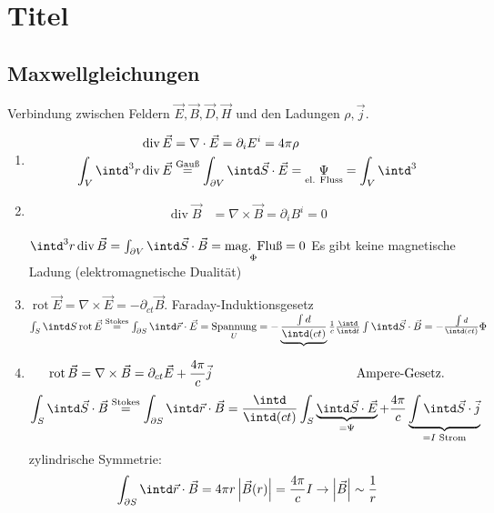 \documentclass{article}
\newcommand{\rot}{\operatorname{rot}}
\renewcommand{\div}{\operatorname{div}}
\begin{document}
    \section*{Titel}
    \subsection{Maxwellgleichungen}
    Verbindung zwischen Feldern $\vec{E}, \vec{B}, \vec{D}, \vec{H}$ und den Ladungen $\rho, \vec{j}$.
    \begin{enumerate}
        \item \begin{align*}
            \div \vec{E} &= \nabla \cdot \vec{E} = \partial_i E^i = 4\pi \rho\\
            \int_V \intd^3 r \div \vec{E} &\stackrel{\text{Gauß}}{=} \int_{\partial V} \intd \vec{S} \cdot \vec{E} = \underset{\text{el. Fluss}}{\Psi} = \int_V \intd^3
        \end{align*}
        \item 
        \begin{align*}
            \div \vec{B} &= \nabla \times \vec{B} = \partial_i B^i = 0
        \end{align*}
        $\intd^3 r \div \vec{B} = \int_{ \partial V} \intd \vec{S} \cdot \vec{B} = \underset{\Phi}{\text{mag. Fluß}} = 0$
        Es gibt keine magnetische Ladung (elektromagnetische Dualität)
        \item $\rot \vec{E} = \nabla \times \vec E = -\partial_{ct} \vec B$. Faraday-Induktionsgesetz
        $\int_S \intd S \rot \vec E \stackrel{\text{Stokes}}{=} \int_{\partial S} \intd \vec r \cdot \vec E = \underset{U}{\text{Spannung}} = -\underbrace{\frac{\int d}{\intd (ct)}}{\frac{1}{c}\frac{\intd}{\intd t}} \int \intd \vec S \cdot \vec B = -\frac{\int d}{\intd (ct)} \Phi$
        \item 
        \[\rot \vec B = \nabla \times \vec B = \partial_{ct} \vec E + \frac{4\pi}{c} \vec j \hspace*{4cm} \text{Ampere-Gesetz.}
        \] 
        \[
            \int_S \intd \vec S\cdot \vec B \stackrel{\text{Stokes}}{=} \int_{\partial S} \intd \vec r \cdot \vec B = \frac{\intd}{\intd (ct)} \int_S \underbrace{\intd \vec S \cdot \vec E}_{=\Psi} + \frac{4\pi}{c}\underbrace{\int \intd \vec S \cdot \vec j}_{= I \text{ Strom}}
        \]
        zylindrische Symmetrie:
        \[
            \int_{\partial S} \intd \vec r \cdot \vec B = 4\pi r \left|\vec B(r)\right| = \frac{4\pi}{c} I \to \left|\vec B\right| \sim \frac{1}{r} 
        \]
    \end{enumerate}
\end{document}
